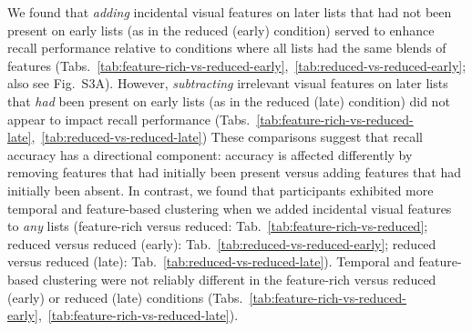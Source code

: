 \documentclass[11pt]{article}
\newcommand{\accuracyByList}{S3}
\newcommand{\abbreviations}{S1}
\begin{document}
\begin{table}[tp]
\centering
\tiny


\caption{\textbf{Comparing memory in the feature-rich versus reduced (late)
conditions (all lists).} The independent samples $t$-tests reported in the
table were carried out across-participants, and reflect data aggregated across
all lists from each participant. Abbreviations used in this table are defined
in Table~\abbreviations.}

\label{tab:feature-rich-vs-reduced-late}
\end{table}

\begin{table}[tp]
\centering
\tiny


\caption{\textbf{Comparing memory in the reduced versus reduced (late)
conditions (all lists).} The independent samples $t$-tests reported in the
table were carried out across-participants, and reflect data aggregated across
all lists from each participant. Abbreviations used in this table are defined
in Table~\abbreviations.}

\label{tab:reduced-vs-reduced-late}
\end{table}

We found that \textit{adding} incidental visual features on later lists that
had not been present on early lists (as in the reduced (early) condition)
served to enhance recall performance relative to conditions where all lists had
the same blends of features
(Tabs.~\ref{tab:feature-rich-vs-reduced-early},~\ref{tab:reduced-vs-reduced-early};
also see Fig.~\accuracyByList A). However, \textit{subtracting} irrelevant
visual features on later lists that \textit{had} been present on early lists
(as in the reduced (late) condition) did not appear to impact recall
performance
(Tabs.~\ref{tab:feature-rich-vs-reduced-late},~\ref{tab:reduced-vs-reduced-late})
These comparisons suggest that recall accuracy has a directional component:
accuracy is affected differently by removing features that had initially been
present versus adding features that had initially been absent. In contrast, we
found that participants exhibited more temporal and feature-based clustering
when we added incidental visual features to \textit{any} lists (feature-rich
versus reduced: Tab.~\ref{tab:feature-rich-vs-reduced}; reduced versus reduced
(early): Tab.~\ref{tab:reduced-vs-reduced-early}; reduced versus reduced
(late): Tab.~\ref{tab:reduced-vs-reduced-late}). Temporal and feature-based
clustering were not reliably different in the feature-rich versus reduced
(early) or reduced (late) conditions
(Tabs.~\ref{tab:feature-rich-vs-reduced-early},~\ref{tab:feature-rich-vs-reduced-late}).
\end{document}
